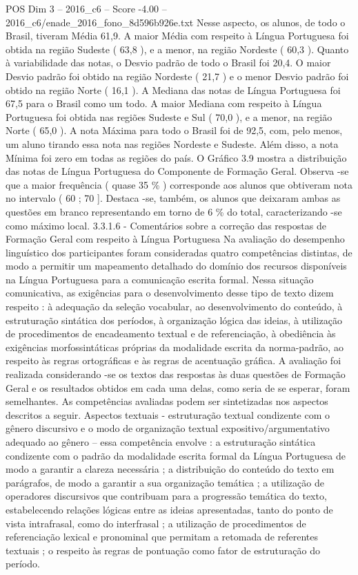 \begin{textsample}{POS Dim 3 – 2016\_c6 – Score -4.00 – 2016\_c6/enade\_2016\_fono\_8d596b926e.txt}
Nesse aspecto, os alunos, de todo o Brasil, tiveram Média 61,9.
A maior Média com respeito à Língua Portuguesa foi obtida na região Sudeste ( 63,8 ), e a menor, na região Nordeste ( 60,3 ).
Quanto à variabilidade das notas, o Desvio padrão de todo o Brasil foi 20,4.
O maior Desvio padrão foi obtido na região Nordeste ( 21,7 ) e o menor Desvio padrão foi obtido na região Norte ( 16,1 ).
A Mediana das notas de Língua Portuguesa foi 67,5 para o Brasil como um todo.
A maior Mediana com respeito à Língua Portuguesa foi obtida nas regiões Sudeste e Sul ( 70,0 ), e a menor, na região Norte ( 65,0 ).
A nota Máxima para todo o Brasil foi de 92,5, com, pelo menos, um aluno tirando essa nota nas regiões Nordeste e Sudeste.
Além disso, a nota Mínima foi zero em todas as regiões do país.
O Gráfico 3.9 mostra a distribuição das notas de Língua Portuguesa do Componente de Formação Geral.
Observa -se que a maior frequência ( quase 35 \% ) corresponde aos alunos que obtiveram nota no intervalo ( 60 ; 70 ].
Destaca -se, também, os alunos que deixaram ambas as questões em branco representando em torno de 6 \% do total, caracterizando -se como máximo local. 3.3.1.6 - Comentários sobre a correção das respostas de Formação Geral com respeito à Língua Portuguesa Na avaliação do desempenho linguístico dos participantes foram consideradas quatro competências distintas, de modo a permitir um mapeamento detalhado do domínio dos recursos disponíveis na Língua Portuguesa para a comunicação escrita formal.
Nessa situação comunicativa, as exigências para o desenvolvimento desse tipo de texto dizem respeito : à adequação da seleção vocabular, ao desenvolvimento do conteúdo, à estruturação sintática dos períodos, à organização lógica das ideias, à utilização de procedimentos de encadeamento textual e de referenciação, à obediência às exigências morfossintáticas próprias da modalidade escrita da norma-padrão, ao respeito às regras ortográficas e às regras de acentuação gráfica.
A avaliação foi realizada considerando -se os textos das respostas às duas questões de Formação Geral e os resultados obtidos em cada uma delas, como seria de se esperar, foram semelhantes.
As competências avaliadas podem ser sintetizadas nos aspectos descritos a seguir.
Aspectos textuais - estruturação textual condizente com o gênero discursivo e o modo de organização textual expositivo/argumentativo adequado ao gênero – essa competência envolve : a estruturação sintática condizente com o padrão da modalidade escrita formal da Língua Portuguesa de modo a garantir a clareza necessária ; a distribuição do conteúdo do texto em parágrafos, de modo a garantir a sua organização temática ; a utilização de operadores discursivos que contribuam para a progressão temática do texto, estabelecendo relações lógicas entre as ideias apresentadas, tanto do ponto de vista intrafrasal, como do interfrasal ; a utilização de procedimentos de referenciação lexical e pronominal que permitam a retomada de referentes textuais ; o respeito às regras de pontuação como fator de estruturação do período.

\end{textsample}
